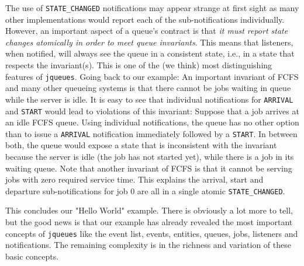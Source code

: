 The use of \lstinline|STATE_CHANGED| notifications may
  appear strange at first sight
  as many other implementations would
  report each of the sub-notifications individually.
However, an important aspect of a queue's contract is that
  {\em it must report state changes atomically
       in order to meet queue invariants}.
This means that listeners,
  when notified,
  will always see the queue in a consistent state,
  i.e., in a state that respects the invariant(s).
This is one of the (we think) most distinguishing features of
  \lstinline|jqueues|.
Going back to our example: An important invariant of FCFS
  and many other queueing systems
  is that there cannot be jobs
  waiting in queue while the server is idle.
It is easy to see that individual notifications for
  \lstinline|ARRIVAL| and \lstinline|START| would
  lead to violations of this invariant:
  Suppose that a job arrives at an idle FCFS queue.
  Using individual notifications,
  the queue has no other option than to
  issue a \lstinline|ARRIVAL|
  notification
  immediately followed by a \lstinline|START|.
In between both, the queue would expose a state
  that is inconsistent with the invariant
  because the server is idle (the job has not started yet),
  while there is a job in its waiting queue.
Note that another invariant of FCFS is that
  it cannot be serving jobs with zero required service time.
This explains the arrival, start and departure sub-notifications
  for job $0$ are all in a single atomic \lstinline|STATE_CHANGED|.
  
This concludes our "Hello World" example.
There is obviously a lot more to tell,
  but the good news is that our example
  has already revealed the most important concepts
  of \lstinline|jqueues| like
  the event list, events, entities, queues, jobs, listeners
  and notifications.
The remaining complexity is in the richness and variation of these
  basic concepts.
